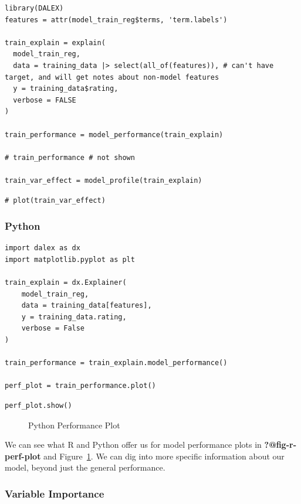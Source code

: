 \documentclass[
  letterpaper,
]{krantz}
\begin{document}
\begin{verbatim}
library(DALEX)
features = attr(model_train_reg$terms, 'term.labels')

train_explain = explain(
  model_train_reg,
  data = training_data |> select(all_of(features)), # can't have target, and will get notes about non-model features
  y = training_data$rating,
  verbose = FALSE
)

train_performance = model_performance(train_explain)

# train_performance # not shown

train_var_effect = model_profile(train_explain)
\end{verbatim}

\begin{verbatim}
# plot(train_var_effect)
\end{verbatim}

\subsubsection{Python}

\begin{verbatim}
import dalex as dx
import matplotlib.pyplot as plt

train_explain = dx.Explainer(
    model_train_reg, 
    data = training_data[features], 
    y = training_data.rating,
    verbose = False
)

train_performance = train_explain.model_performance()

perf_plot = train_performance.plot()
\end{verbatim}

\begin{verbatim}
perf_plot.show()
\end{verbatim}

\begin{figure}[H]

\centering{

}

\caption{\label{fig-py-perf-plot}Python Performance Plot}

\end{figure}%

We can see what R and Python offer us for model performance plots in
\textbf{?@fig-r-perf-plot} and Figure~\ref{fig-py-perf-plot}. We can dig
into more specific information about our model, beyond just the general
performance.

\subsubsection{Variable Importance}\label{variable-importance}
\end{document}
